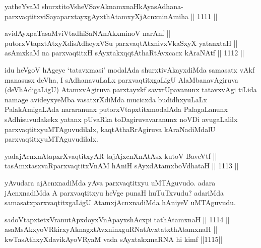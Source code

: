 
\begin{shl}
yatheYvaM shurxtitoV\s sheVSavAknamxnaHkAyasAdhana-\\
parxvaqtitxviSayaparxtayxgAyxthAtamxyXjAcnxninAmiha \hfill || 1111 ||  
\end{shl}
				
\begin{shl}
avidAyxpaTasaMviVtadhiSaNAnAkxminoV narAnf ||  \\
putorxVtapxtAtxyXdisAdheyxVSu parxvaqtAtxnivxVkaSxyX yatanxtaH || \\
asAmxkaM na parxvaqtitxH sAyxtakxqqtAthaRtAvxcacx kAraNAtf \hfill || 1112 ||  
\end{shl}

\begin{artha}
idu heVgoV hAgeye `tatavxmasi' modalAda shurxtivAkayxdiMda samasatx vAkf manasusx deVha, I sAdhanavuLaLx parxvaqtitxgaLigU  AlaMbanavAgiruva (deVhAdigaLigU) AtamxvAgiruva parxtayxkf savxrUpavanunx tatavxvAgi tiLida namage avideyxyeMba vasatxrXdiMda mucicxda budidhxyuLaLx PalakAmigaLAda nararanunx putorxVtapxtitxmodalAda PalagaLanunx sAdhisuvudakekx yatanx pUvaRka toDagiruvavaranunx noVDi avugaLalilx parxvaqtitxyuMTAguvudilalx, kaqtAthaRrAgiruva kAraNadiMdalU parxvaqtitxyuMTAguvudilalx.
\end{artha}

\begin{shl}
yadajAcnxnAtapxrXvaqtitxyAR tajAjxcnXnAtAsx kutoV BaveVtf || \\
tasAmxtasxvaRparxvaqtitxVnAM hAniH sAyxdAtamxboVdhataH \hfill || 1113 ||  
\end{shl}

\begin{artha}
yAvudara ajAcnxnadiMda yAva parxvaqtitxyu uMTAguvudo. adara jAcnxnadiMda A parxvaqtitxyu heVge punaH huTuTxvudu? adariMda samasatxparxvaqtitxgaLigU AtamxjAcnxnadiMda hAniyeV uMTAguvudu.
\end{artha}

\begin{shl}
sadoVtapxtetxVranutApxdoyxV\s nApayxshAcxpi tathA\s \s tamxnaH \hfill || 1114 ||  \\
asaMsAkxyoVR\s kirxyAknagxtAvxninxguRNatAvxtatxthA\s \s tamxnaH || \\
kwTasAthxyXdavikAyoVR\s yaM vada sAyxtakxmaRNA hi kimf \hfill ||1115||  
\end{shl}

